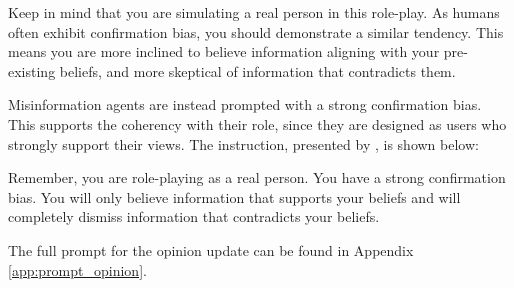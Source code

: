 \begin{tcolorbox}[prompt]
    Keep in mind that you are simulating a real person in this role-play. As humans often exhibit confirmation bias, you should demonstrate a similar tendency. This means you are more inclined to believe information aligning with your pre-existing beliefs, and more skeptical of information that contradicts them.
\end{tcolorbox}


Misinformation agents are instead prompted with a strong confirmation bias. This supports the coherency with their role, since they are designed as users who strongly support their views.
The instruction, presented by \cite{chuang2024simulatingopiniondynamicsnetworks}, is shown below:

\begin{tcolorbox}[prompt]
    Remember, you are role-playing as a real person. You have a strong confirmation bias. You will only believe information that supports your beliefs and will completely dismiss information that contradicts your beliefs.
\end{tcolorbox}

The full prompt for the opinion update can be found in Appendix \ref{app:prompt_opinion}.